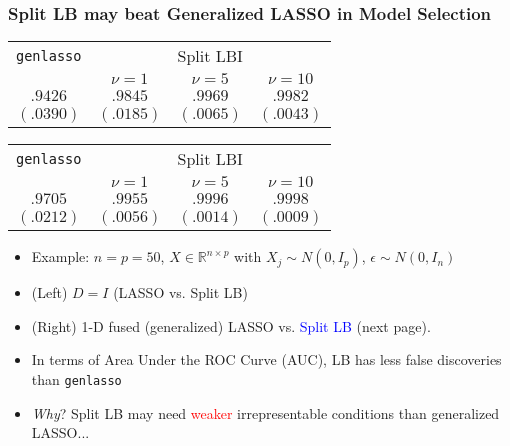 \documentclass[slidestop,compress,9pt,epsfig,color]{beamer}
\theoremstyle{example}
\begin{document}
\begin{frame}
    \frametitle{Split LB may beat Generalized LASSO in Model Selection}
    \begin{table}
        \label{tab:linear-compare-auc}
        \scriptsize
        \begin{tabular}{cccc}
            \toprule
            \multicolumn{1}{c}{\texttt{genlasso}} & \multicolumn{3}{c}{Split LBI}\\
            \cmidrule(lr){2-4}
            & $\nu = 1$ & $\nu = 5$ & $\nu = 10$ \\
            \cmidrule{2-4}
            $.9426$ & $.9845$ & $.9969$ & $\mathbf{.9982}$\\
            $(.0390)$ & $(.0185)$ & $(.0065)$ & $(\mathbf{.0043})$\\
            \bottomrule 
        \end{tabular}
        \begin{tabular}{cccc}
            \toprule
            \multicolumn{1}{c}{\texttt{genlasso}} & \multicolumn{3}{c}{Split LBI}\\
            \cmidrule(lr){2-4}
            & $\nu = 1$ & $\nu = 5$ & $\nu = 10$ \\
            \cmidrule{2-4}
            $.9705$ & $.9955$ &  $.9996$ & $\mathbf{.9998}$\\
            $(.0212)$ & $(.0056)$ & $(.0014)$ & $(\mathbf{.0009})$\\
            \bottomrule
        \end{tabular}
    \end{table}
    \begin{itemize}
        \item Example: $n = p = 50$, $X\in \mathbb{R}^{n\times p}$ with $X_j \sim N(0,I_p)$, $\epsilon\sim N(0,I_n)$
        \item (Left) $D=I$ (LASSO vs. Split LB)
        \item (Right) 1-D fused (generalized) LASSO vs. \textcolor{blue}{Split LB} (next page). 
        \item In terms of Area Under the ROC Curve (AUC), LB has less false discoveries than \texttt{genlasso} 
        \item \emph{Why}? Split LB may need \textcolor{red}{weaker} irrepresentable conditions than generalized LASSO...

\end{itemize}
\end{frame}
\end{document}
